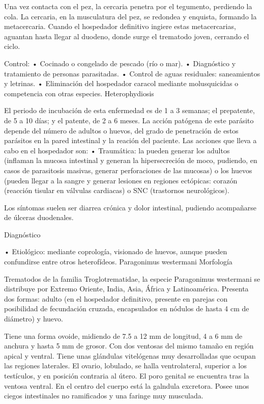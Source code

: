 Una vez contacta con el pez, la cercaria penetra por el tegumento, perdiendo la cola. La cercaria, en la musculatura del pez, se redondea y enquista, formando la metacercaria. Cuando el hospedador definitivo ingiere estas metacercarias, aguantan hasta llegar al duodeno, donde surge el trematodo joven, cerrando el ciclo.

Control:
• Cocinado o congelado de pescado (río o mar).
• Diagnóstico y tratamiento de personas parasitadas.
• Control de aguas residuales: saneamientos y letrinas.
• Eliminación del hospedador caracol mediante molusquicidas o competencia con otras especies.
Heterophydiosis

El periodo de incubación de esta enfermedad es de 1 a 3 semanas; el prepatente, de 5 a 10 días; y el patente, de 2 a 6 meses. La acción patógena de este parásito depende del número de adultos o huevos, del grado de penetración de estos parásitos en la pared intestinal y la reación del paciente. Las acciones que lleva a cabo en el hospedador son:
• Traumática: la pueden generar los adultos (inflaman la mucosa intestinal y generan la hipersecreción de moco, pudiendo, en casos de parasitosis masivas, generar perforaciones de las mucosas) o los huevos (pueden llegar a la sangre y generar lesiones en regiones ectópicas: corazón (reacción tisular en válvulas cardiacas) o SNC (trastornos neurológicos).

Los síntomas suelen ser diarrea crónica y dolor intestinal, pudiendo acompañarse de úlceras duodenales.

Diagnóstico

• Etiológico: mediante coprología, visionado de huevos, aunque pueden confundirse entre otros heterofídeos.
\newpage
Paragonimus westermani
Morfología

Trematodos de la familia Troglotrematidae, la especie Paragonimus westermani se distribuye por Extremo Oriente, India, Asia, África y Latinoamérica. Presenta dos formas: adulto (en el hospedador definitivo, presente en parejas con posibilidad de fecundación cruzada, encapsulados en nódulos de hasta 4 cm de diámetro) y huevo.

Tiene una forma ovoide, midiendo de 7.5 a 12 mm de longitud, 4 a 6 mm de anchura y hasta 5 mm de grosor. Con dos ventosas del mismo tamaño en región apical y ventral. Tiene unas glándulas vitelógenas muy desarrolladas que ocupan las regiones laterales. El ovario, lobulado, se halla ventrolateral, superior a los testículos, y en posición contraria al útero. El poro genital se encuentra tras la ventosa ventral. En el centro del cuerpo está la galndula excretora. Posee unos ciegos intestinales no ramificados y una faringe muy musculada.

